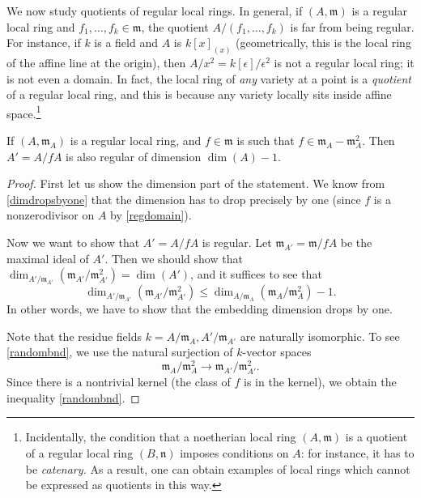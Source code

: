 We now study quotients of regular local rings. 
In general, if $(A, \mathfrak{m})$ is a regular local ring and $f_1, \dots, f_k \in
\mathfrak{m}$, the quotient $A/(f_1, \dots, f_k)$ is far from being regular. 
For instance, if $k$ is a field and $A$ is $k[x]_{(x)}$ (geometrically, this is
the local ring of the affine line at the origin), then $A/x^2 =
k[\epsilon]/\epsilon^2$ is not a regular local ring; it is not even a domain. 
In fact, the local ring of \emph{any} variety at a point is a \emph{quotient} of a
regular local ring, and this is because any variety locally sits inside affine
space.\footnote{Incidentally, the condition that a noetherian local ring $(A,
\mathfrak{m})$ is a
quotient of a regular local ring  $(B, \mathfrak{n})$ imposes conditions on
$A$: for instance, it has to be \emph{catenary.} As a result, one can obtain
examples of local rings which cannot be expressed as quotients in this way.}

\begin{proposition}
If $(A, \mathfrak{m}_A)$ is a regular local ring, and $f \in \mathfrak{m}$ is such that $f \in
\mathfrak{m}_A- \mathfrak{m}_A^2$. Then $A'=A/fA$ is also regular of dimension $\dim(A)-1$.
\label{reg loc mod f still reg loc}
\end{proposition}
\begin{proof} First let us show the dimension part of the statement. We know
from \cref{dimdropsbyone} that the dimension has to drop precisely by one (since $f$ is  a
nonzerodivisor on $A$ by \cref{regdomain}). 


Now we want to show that $A' = A/fA$ is regular. 
Let $\mathfrak{m}_{A'} = \mathfrak{m}/fA$ be the maximal ideal of $A'$.
Then we should show that
$\dim_{A'/\mathfrak{m}_{A'}}(\mathfrak{m}_{A'}/\mathfrak{m}_{A'}^2)=\dim(A')$,
and it suffices to see that  \begin{equation} \label{randombnd}
\dim_{A'/\mathfrak{m}_{A'}}(\mathfrak{m}_{A'}/\mathfrak{m}_{A'}^2) \leq
\dim_{A/\mathfrak{m}_A}(\mathfrak{m}_{A}/\mathfrak{m}_A^2)-1.\end{equation}
In other words, we have to show that the embedding dimension drops by one.


Note that the residue fields $k=A/\mathfrak{m}_A, A'/\mathfrak{m}_{A'}$ are
naturally isomorphic.
To see \eqref{randombnd}, we use the natural surjection of $k$-vector spaces
\[ \mathfrak{m}_A/\mathfrak{m}_A^2 \to \mathfrak{m}_{A'}/\mathfrak{m}_{A'}^2.  \]
Since there is a nontrivial kernel (the class of $f$ is in the kernel), we
obtain the inequality \eqref{randombnd}.
\end{proof}



